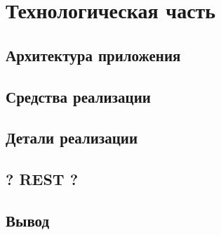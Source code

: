 \chapter{Технологическая часть}

\section{Архитектура приложения}

\section{Средства реализации}

\section{Детали реализации}

\section{? REST ?}

\section*{Вывод}
